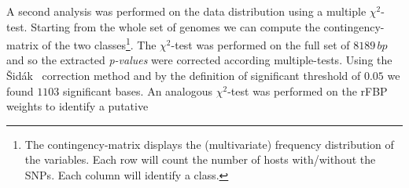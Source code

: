 \documentclass{standalone}
\begin{document}
A second analysis was performed on the data distribution using a multiple $\chi^2$-test.
Starting from the whole set of genomes we can compute the contingency-matrix of the two classes\footnote{
  The contingency-matrix displays the (multivariate) frequency distribution of the variables.
  Each row will count the number of hosts with/without the SNPs.
  Each column will identify a class.
}.
The $\chi^2$-test was performed on the full set of $8189\,bp$ and so the extracted \emph{p-values} were corrected according multiple-tests.
Using the \v{S}id\'ak~\cite{Sidak1967} correction method and by the definition of significant threshold of $0.05$ we found $1103$ significant bases.
An analogous $\chi^2$-test was performed on the rFBP weights to identify a putative

\end{document}
